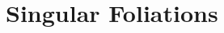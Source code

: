 \documentclass[
aspectratio=3218, 
10pt, hyperref={pdfpagelabels=false}]{beamer}
\def\bas#1\eas{\begin{align*}#1\end{align*}}
\theoremstyle{plain}
\theoremstyle{remark}
\newtheorem*{remark}{Remarks}
\begin{document}
%
%
%
%
%



\section{Singular Foliations}

\end{document}

